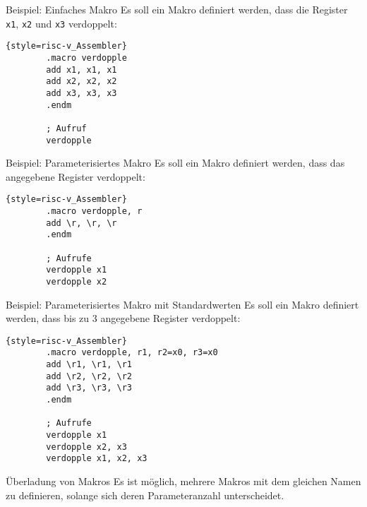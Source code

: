 \begin{exampleblock}{Beispiel: Einfaches Makro}
	Es soll ein Makro definiert werden, dass die Register \texttt{x1}, \texttt{x2}
	und \texttt{x3} verdoppelt:
	\begin{lstlisting}{style=risc-v_Assembler}
		.macro verdopple
		add x1, x1, x1
		add x2, x2, x2
		add x3, x3, x3
		.endm
		
		; Aufruf
		verdopple
	\end{lstlisting}
\end{exampleblock}

\begin{exampleblock}{Beispiel: Parameterisiertes Makro}
	Es soll ein Makro definiert werden, dass das angegebene Register verdoppelt:
	\begin{lstlisting}{style=risc-v_Assembler}
		.macro verdopple, r
		add \r, \r, \r
		.endm
		
		; Aufrufe
		verdopple x1
		verdopple x2
	\end{lstlisting}
\end{exampleblock}

\begin{exampleblock}{Beispiel: Parameterisiertes Makro mit Standardwerten}
	Es soll ein Makro definiert werden, dass bis zu 3 angegebene Register
	verdoppelt:
	\begin{lstlisting}{style=risc-v_Assembler}
		.macro verdopple, r1, r2=x0, r3=x0
		add \r1, \r1, \r1
		add \r2, \r2, \r2
		add \r3, \r3, \r3
		.endm
		
		; Aufrufe
		verdopple x1
		verdopple x2, x3
		verdopple x1, x2, x3
	\end{lstlisting}
\end{exampleblock}

\begin{infoblock}{Überladung von Makros}
	Es ist möglich, mehrere Makros mit dem gleichen Namen zu definieren, solange
	sich deren Parameteranzahl unterscheidet.
\end{infoblock}

